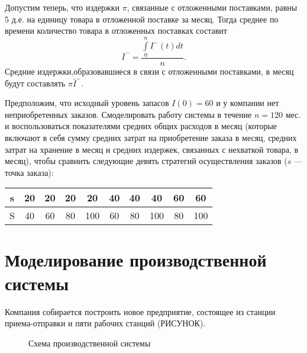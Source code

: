 Допустим теперь, что издержки $\pi$, связанные с отложенными
поставками, равны 5 д.е. на единицу товара в отложенной поставке
за месяц. Тогда среднее по времени количество товара в отложенных
поставках составит
\begin{equation*}
\bar{I}^-=\dfrac{\int\limits_0^nI^-(t)dt}{n}.
\end{equation*}
Средние издержки,образовавшиеся в связи с отложенными поставками,
в месяц будут составлять $\pi \bar{I}^-$.

Предположим, что исходный уровень запасов $I(0)=60$ и у компании
нет неприобретенных заказов. Смоделировать работу системы в
течение $n=120$ мес. и воспользоваться показателями средних общих
расходов в месяц (которые включают в себя сумму средних затрат на
приобретение заказа в месяц, средних затрат на хранение в месяц и
средних издержек, связанных с нехваткой товара, в месяц), чтобы
сравнить следующие девять стратегий осуществления заказов ($s$ ---
точка заказа): \\
\begin{center}
\begin{tabular}{c|ccccccccc}
\hline s & 20 & 20 & 20 & 20 & 40 & 40 & 40 & 60 & 60 \\
\hline S & 40 & 60 & 80 & 100 & 60 & 80 & 100 & 80 & 100 \\
\hline
\end{tabular}
\end{center}

\newpage
\section{Моделирование производственной системы}
 Компания собирается построить новое предприятие, состоящее из
станции приема-отправки и пяти рабочих станций (РИСУНОК).
\begin{figure}[!h]
\caption{Схема производственной системы}
\end{figure}

